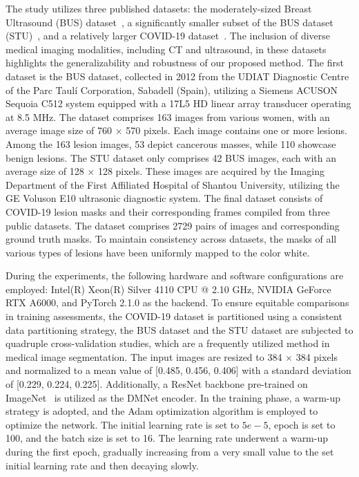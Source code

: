\documentclass[review]{elsarticle}
\begin{document}
	The study utilizes three published datasets: the moderately-sized Breast Ultrasound (BUS) dataset~\cite{yap2017automated}, a significantly smaller subset of the BUS dataset (STU)~\cite{zhuang2019rdau}, and a relatively larger COVID-19 dataset~\cite{maftouni2021robust}. The inclusion of diverse medical imaging modalities, including CT and ultrasound, in these datasets highlights the generalizability and robustness of our proposed method. The first dataset is the BUS dataset, collected in 2012 from the UDIAT Diagnostic Centre of the Parc Taulí Corporation, Sabadell (Spain), utilizing a Siemens ACUSON Sequoia C512 system equipped with a 17L5 HD linear array transducer operating at 8.5 MHz. The dataset comprises 163 images from various women, with an average image size of 760 $ \times $ 570 pixels. Each image contains one or more lesions. Among the 163 lesion images, 53 depict cancerous masses, while 110 showcase benign lesions. The STU dataset only comprises 42 BUS images, each with an average size of 128 $ \times $ 128 pixels. These images are acquired by the Imaging Department of the First Affiliated Hospital of Shantou University, utilizing the GE Voluson E10 ultrasonic diagnostic system. The final dataset consists of COVID-19 lesion masks and their corresponding frames compiled from three public datasets. The dataset comprises 2729 pairs of images and corresponding ground truth masks. To maintain consistency across datasets, the masks of all various types of lesions have been uniformly mapped to the color white.

	During the experiments, the following hardware and software configurations are employed: Intel(R) Xeon(R) Silver 4110 CPU @ 2.10 GHz, NVIDIA GeForce RTX A6000, and PyTorch 2.1.0 as the backend. To ensure equitable comparisons in training assessments, the COVID-19 dataset is partitioned using a consistent data partitioning strategy, the BUS dataset and the STU dataset are subjected to quadruple cross-validation studies, which are a frequently utilized method in medical image segmentation. The input images are resized to 384 $ \times $ 384 pixels and normalized to a mean value of [0.485, 0.456, 0.406] with a standard deviation of [0.229, 0.224, 0.225]. Additionally, a ResNet backbone pre-trained on ImageNet~\cite{he2016deep} is utilized as the DMNet encoder. In the training phase, a warm-up strategy is adopted, and the Adam optimization algorithm is employed to optimize the network. The initial learning rate is set to $5e-5$, epoch is set to 100, and the batch size is set to 16. The learning rate underwent a warm-up during the first epoch, gradually increasing from a very small value to the set initial learning rate and then decaying slowly.
\end{document}
